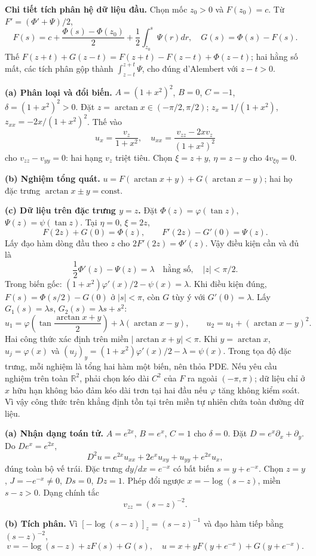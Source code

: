 \textbf{Chi tiết tích phân hệ dữ liệu đầu.} Chọn mốc $z_0>0$ và $F(z_0)=c$. Từ $F'=(\Phi'+\Psi)/2$,
\[F(s)=c+\frac{\Phi(s)-\Phi(z_0)}2+\frac12\int_{z_0}^{s}\Psi(r)dr,\quad G(s)=\Phi(s)-F(s).\]
Thế $F(z+t)+G(z-t)=F(z+t)-F(z-t)+\Phi(z-t)$; hai hằng số mất, các tích phân gộp thành $\int_{z-t}^{z+t}\Psi$, cho đúng d'Alembert với $z-t>0$.

\textbf{(a) Phân loại và đổi biến.} $A=(1+x^2)^2$, $B=0$, $C=-1$, $\delta=(1+x^2)^2>0$. Đặt $z=\arctan x\in(-\pi/2,\pi/2)$; $z_x=1/(1+x^2)$, $z_{xx}=-2x/(1+x^2)^2$. Thế vào
\[u_x=\frac{v_z}{1+x^2},\quad u_{xx}=\frac{v_{zz}-2xv_z}{(1+x^2)^2}\]
cho $v_{zz}-v_{yy}=0$: hai hạng $v_z$ triệt tiêu. Chọn $\xi=z+y$, $\eta=z-y$ cho $4v_{\xi\eta}=0$.

\textbf{(b) Nghiệm tổng quát.} $u=F(\arctan x+y)+G(\arctan x-y)$; hai họ đặc trưng $\arctan x\pm y=\mathrm{const}$.

\textbf{(c) Dữ liệu trên đặc trưng $y=z$.} Đặt $\Phi(z)=\varphi(\tan z)$, $\Psi(z)=\psi(\tan z)$. Tại $\eta=0$, $\xi=2z$,
\[F(2z)+G(0)=\Phi(z),\qquad F'(2z)-G'(0)=\Psi(z).\]
Lấy đạo hàm dòng đầu theo $z$ cho $2F'(2z)=\Phi'(z)$. Vậy điều kiện cần và đủ là
\[\boxed{\frac12\Phi'(z)-\Psi(z)=\lambda\quad\text{hằng số},\quad |z|<\pi/2.}\]
Trong biến gốc: $(1+x^2)\varphi'(x)/2-\psi(x)=\lambda$. Khi điều kiện đúng, $F(s)=\Phi(s/2)-G(0)$ ở $|s|<\pi$, còn $G$ tùy ý với $G'(0)=\lambda$. Lấy $G_1(s)=\lambda s$, $G_2(s)=\lambda s+s^2$:
\[u_1=\varphi\!\left(\tan\frac{\arctan x+y}{2}\right)+\lambda(\arctan x-y),\qquad
u_2=u_1+(\arctan x-y)^2.\]
Hai công thức xác định trên miền $|\arctan x+y|<\pi$. Khi $y=\arctan x$, $u_j=\varphi(x)$ và $(u_j)_y=(1+x^2)\varphi'(x)/2-\lambda=\psi(x)$. Trong tọa độ đặc trưng, mỗi nghiệm là tổng hai hàm một biến, nên thỏa PDE. Nếu yêu cầu nghiệm trên toàn $\mathbb R^2$, phải chọn kéo dài $C^2$ của $F$ ra ngoài $(-\pi,\pi)$; dữ liệu chỉ ở $x$ hữu hạn không bảo đảm kéo dài trơn tại hai đầu nếu $\varphi$ tăng không kiểm soát. Vì vậy công thức trên khẳng định tồn tại trên miền tự nhiên chứa toàn đường dữ liệu.

\textbf{(a) Nhận dạng toán tử.} $A=e^{2x}$, $B=e^x$, $C=1$ cho $\delta=0$. Đặt $D=e^x\partial_x+\partial_y$. Do $De^x=e^{2x}$,
\[D^2u=e^{2x}u_{xx}+2e^xu_{xy}+u_{yy}+e^{2x}u_x,\]
đúng toàn bộ vế trái. Đặc trưng $dy/dx=e^{-x}$ có bất biến $s=y+e^{-x}$. Chọn $z=y$, $J=-e^{-x}\ne0$, $Ds=0$, $Dz=1$. Phép đổi ngược $x=-\log(s-z)$, miền $s-z>0$. Dạng chính tắc
\[v_{zz}=(s-z)^{-2}.\]

\textbf{(b) Tích phân.} Vì $[-\log(s-z)]_z=(s-z)^{-1}$ và đạo hàm tiếp bằng $(s-z)^{-2}$,
\[v=-\log(s-z)+zF(s)+G(s),\quad
u=x+yF(y+e^{-x})+G(y+e^{-x}).\]


